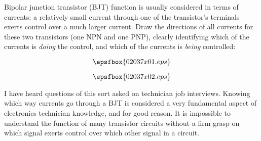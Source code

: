 

Bipolar junction transistor (BJT) function is usually considered in terms of currents: a relatively small current through one of the transistor's terminals exerts control over a much larger current.  Draw the directions of all currents for these two transistors (one NPN and one PNP), clearly identifying which of the currents is {\it doing} the control, and which of the currents is {\it being} controlled:

$$\epsfbox{02037x01.eps}$$







$$\epsfbox{02037x02.eps}$$







I have heard questions of this sort asked on technician job interviews.  Knowing which way currents go through a BJT is considered a very fundamental aspect of electronics technician knowledge, and for good reason.  It is impossible to understand the function of many transistor circuits without a firm grasp on which signal exerts control over which other signal in a circuit.




